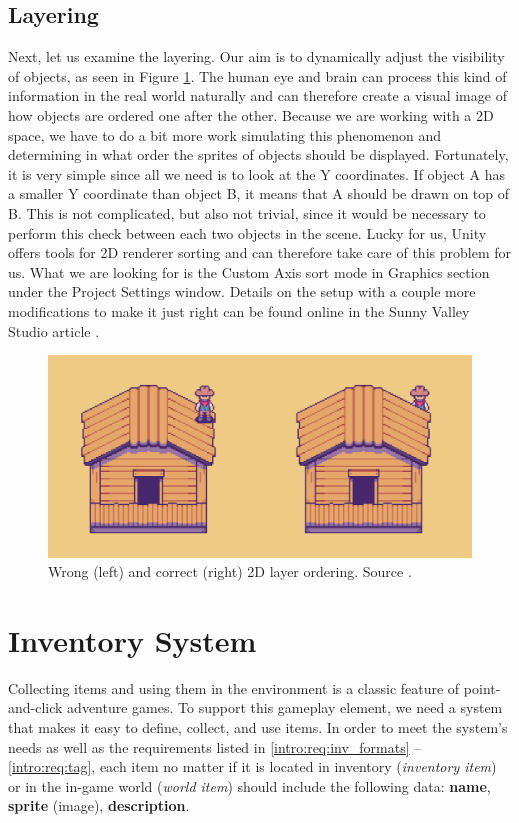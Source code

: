 \subsection{Layering}
Next, let us examine the layering. Our aim is to dynamically adjust the visibility of objects, as seen in Figure \ref{fig:Layers}. The human eye and brain can process this kind of information in the real world naturally and can therefore create a visual image of how objects are ordered one after the other. Because we are working with a 2D space, we have to do a bit more work simulating this phenomenon and determining in what order the sprites of objects should be displayed. Fortunately, it is very simple since all we need is to look at the Y coordinates. If object A has a smaller Y coordinate than object B, it means that A should be drawn on top of B. This is not complicated, but also not trivial, since it would be necessary to perform this check between each two objects in the scene. Lucky for us, Unity offers tools for 2D renderer sorting \cite{Unity-sorting} and can therefore take care of this problem for us. What we are looking for is the Custom Axis sort mode \cite{Unity-customAxis} in Graphics section under the Project Settings window. Details on the setup with a couple more modifications to make it just right can be found online in the Sunny Valley Studio article \cite{Piotr} . 

\begin{figure}[H]
\centering
\includegraphics[width=.8\linewidth]{img/layers.png}
\caption{Wrong (left) and correct (right) 2D layer ordering. Source \cite{Piotr}.}
\label{fig:Layers}
\end{figure}

\section{Inventory System}
Collecting items and using them in the environment is a classic feature of point-and-click adventure games. To support this gameplay element, we need a system that makes it easy to define, collect, and use items. In order to meet the system's needs as well as the requirements listed in \ref{intro:req:inv_formats} – \ref{intro:req:tag}, each item no matter if it is located in inventory (\textit{inventory item}) or in the in-game world (\textit{world item}) should include the following data: \textbf{name}, \textbf{sprite} (image), \textbf{description}.

